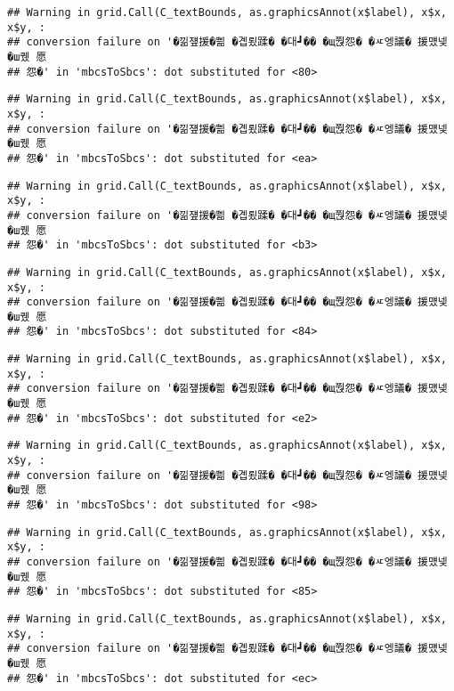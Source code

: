\documentclass[
]{article}
\begin{document}
\begin{verbatim}
## Warning in grid.Call(C_textBounds, as.graphicsAnnot(x$label), x$x, x$y, :
## conversion failure on '�낆쟾援�쁾 �곕룄蹂� �대┛�� �щ쭩怨� �ㅼ엥議� 援먰넻�ш퀬 愿
## 怨�' in 'mbcsToSbcs': dot substituted for <80>
\end{verbatim}

\begin{verbatim}
## Warning in grid.Call(C_textBounds, as.graphicsAnnot(x$label), x$x, x$y, :
## conversion failure on '�낆쟾援�쁾 �곕룄蹂� �대┛�� �щ쭩怨� �ㅼ엥議� 援먰넻�ш퀬 愿
## 怨�' in 'mbcsToSbcs': dot substituted for <ea>
\end{verbatim}

\begin{verbatim}
## Warning in grid.Call(C_textBounds, as.graphicsAnnot(x$label), x$x, x$y, :
## conversion failure on '�낆쟾援�쁾 �곕룄蹂� �대┛�� �щ쭩怨� �ㅼ엥議� 援먰넻�ш퀬 愿
## 怨�' in 'mbcsToSbcs': dot substituted for <b3>
\end{verbatim}

\begin{verbatim}
## Warning in grid.Call(C_textBounds, as.graphicsAnnot(x$label), x$x, x$y, :
## conversion failure on '�낆쟾援�쁾 �곕룄蹂� �대┛�� �щ쭩怨� �ㅼ엥議� 援먰넻�ш퀬 愿
## 怨�' in 'mbcsToSbcs': dot substituted for <84>
\end{verbatim}

\begin{verbatim}
## Warning in grid.Call(C_textBounds, as.graphicsAnnot(x$label), x$x, x$y, :
## conversion failure on '�낆쟾援�쁾 �곕룄蹂� �대┛�� �щ쭩怨� �ㅼ엥議� 援먰넻�ш퀬 愿
## 怨�' in 'mbcsToSbcs': dot substituted for <e2>
\end{verbatim}

\begin{verbatim}
## Warning in grid.Call(C_textBounds, as.graphicsAnnot(x$label), x$x, x$y, :
## conversion failure on '�낆쟾援�쁾 �곕룄蹂� �대┛�� �щ쭩怨� �ㅼ엥議� 援먰넻�ш퀬 愿
## 怨�' in 'mbcsToSbcs': dot substituted for <98>
\end{verbatim}

\begin{verbatim}
## Warning in grid.Call(C_textBounds, as.graphicsAnnot(x$label), x$x, x$y, :
## conversion failure on '�낆쟾援�쁾 �곕룄蹂� �대┛�� �щ쭩怨� �ㅼ엥議� 援먰넻�ш퀬 愿
## 怨�' in 'mbcsToSbcs': dot substituted for <85>
\end{verbatim}

\begin{verbatim}
## Warning in grid.Call(C_textBounds, as.graphicsAnnot(x$label), x$x, x$y, :
## conversion failure on '�낆쟾援�쁾 �곕룄蹂� �대┛�� �щ쭩怨� �ㅼ엥議� 援먰넻�ш퀬 愿
## 怨�' in 'mbcsToSbcs': dot substituted for <ec>
\end{verbatim}
\end{document}
